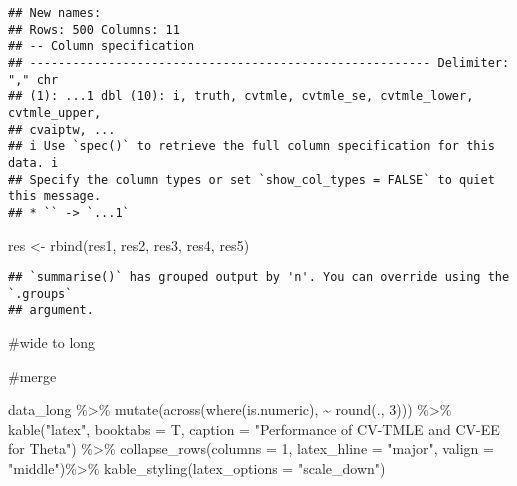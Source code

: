 \documentclass[
]{article}
\newenvironment{Shaded}{\begin{snugshade}}{\end{snugshade}}
\newcommand{\AttributeTok}[1]{\textcolor[rgb]{0.77,0.63,0.00}{#1}}
\newcommand{\DecValTok}[1]{\textcolor[rgb]{0.00,0.00,0.81}{#1}}
\newcommand{\FunctionTok}[1]{\textcolor[rgb]{0.00,0.00,0.00}{#1}}
\newcommand{\NormalTok}[1]{#1}
\newcommand{\OtherTok}[1]{\textcolor[rgb]{0.56,0.35,0.01}{#1}}
\newcommand{\SpecialCharTok}[1]{\textcolor[rgb]{0.00,0.00,0.00}{#1}}
\newcommand{\StringTok}[1]{\textcolor[rgb]{0.31,0.60,0.02}{#1}}
\begin{document}
\begin{verbatim}
## New names:
## Rows: 500 Columns: 11
## -- Column specification
## -------------------------------------------------------- Delimiter: "," chr
## (1): ...1 dbl (10): i, truth, cvtmle, cvtmle_se, cvtmle_lower, cvtmle_upper,
## cvaiptw, ...
## i Use `spec()` to retrieve the full column specification for this data. i
## Specify the column types or set `show_col_types = FALSE` to quiet this message.
## * `` -> `...1`
\end{verbatim}

\begin{Shaded}
\begin{Highlighting}[]
\NormalTok{res }\OtherTok{\textless{}{-}} \FunctionTok{rbind}\NormalTok{(res1, res2, res3, res4, res5)}
\end{Highlighting}
\end{Shaded}

\begin{verbatim}
## `summarise()` has grouped output by 'n'. You can override using the `.groups`
## argument.
\end{verbatim}

\#wide to long

\#merge

\newpage

\begin{Shaded}
\begin{Highlighting}[]
\NormalTok{data\_long }\SpecialCharTok{\%\textgreater{}\%} 
  \FunctionTok{mutate}\NormalTok{(}\FunctionTok{across}\NormalTok{(}\FunctionTok{where}\NormalTok{(is.numeric), }\SpecialCharTok{\textasciitilde{}} \FunctionTok{round}\NormalTok{(., }\DecValTok{3}\NormalTok{))) }\SpecialCharTok{\%\textgreater{}\%} 
  \FunctionTok{kable}\NormalTok{(}\StringTok{"latex"}\NormalTok{, }\AttributeTok{booktabs =}\NormalTok{ T, }\AttributeTok{caption =} \StringTok{"Performance of CV{-}TMLE and CV{-}EE for Theta"}\NormalTok{) }\SpecialCharTok{\%\textgreater{}\%} 
  \FunctionTok{collapse\_rows}\NormalTok{(}\AttributeTok{columns =} \DecValTok{1}\NormalTok{, }\AttributeTok{latex\_hline =} \StringTok{"major"}\NormalTok{, }\AttributeTok{valign =} \StringTok{"middle"}\NormalTok{)}\SpecialCharTok{\%\textgreater{}\%}
  \FunctionTok{kable\_styling}\NormalTok{(}\AttributeTok{latex\_options =} \StringTok{"scale\_down"}\NormalTok{)}
\end{Highlighting}
\end{Shaded}
\end{document}
